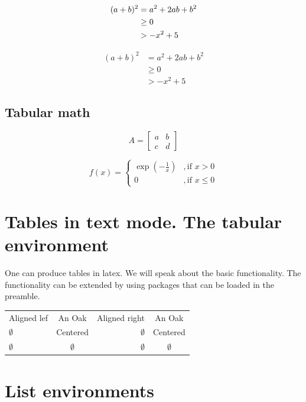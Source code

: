 \documentclass[a4paper]{article}
\begin{document}
  \begin{align}
    (a+b)^2 &= a^2 + 2ab + b^2 \\
      & \geq 0 \\
      & > - x^2 +5 \notag
   \end{align}

  \begin{align*}
    (a+b)^2 &= a^2 + 2ab + b^2 \\
      & \geq 0 \\
      & > - x^2 +5
  \end{align*}
   
\subsection{Tabular math}


  $$%
    A = %
    \begin{bmatrix}
      a & b \\ c & d
    \end{bmatrix}
  $$


  $$
  f(x ) = %
    \begin{cases}
      \exp\left(-\frac{1}{x}\right) &, \text{if } x > 0 \\
      0 &, \text{if } x\leq 0
    \end{cases}
  $$


\section{Tables in text mode. The tabular environment}

One can produce tables in latex. We will speak about the basic functionality. The functionality can be extended by using packages that can be loaded in the preamble. 

\begin{tabular}{l c r | c} %
Aligned lef & An Oak &  Aligned right & An Oak \\
$\emptyset$ & Centered & $\emptyset$ &  Centered \\
\hline %
$\emptyset$ & $\emptyset$ & $\emptyset$ &  $\emptyset$ \\
\end{tabular}


\section{List environments}
\end{document}
